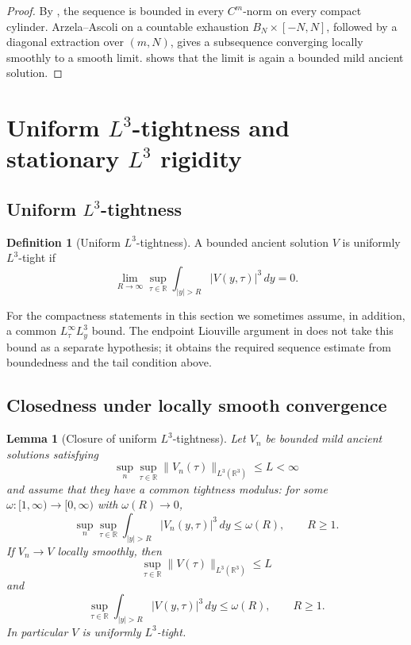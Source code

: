 \documentclass[11pt]{amsart}
\theoremstyle{plain}
\newtheorem{lemma}[theorem]{Lemma}
\theoremstyle{definition}
\newtheorem{definition}[theorem]{Definition}
\theoremstyle{remark}
\numberwithin{equation}{section}
\newcommand{\R}{\mathbb R}
\begin{document}
\begin{proof}
By , the sequence is bounded in every
\(C^m\)-norm on every compact cylinder.  Arzela--Ascoli on a countable
exhaustion \(B_N\times[-N,N]\), followed by a diagonal extraction over
\((m,N)\), gives a subsequence converging locally smoothly to a smooth limit.
 shows that the limit is again a bounded mild ancient
solution.
\end{proof}

\section{\texorpdfstring{Uniform \(L^3\)-tightness and stationary \(L^3\) rigidity}{Uniform L3-tightness and stationary L3 rigidity}}
\label{sec:tightness-rigidity}

\subsection{\texorpdfstring{Uniform \(L^3\)-tightness}{Uniform L3-tightness}}

\begin{definition}[Uniform \(L^3\)-tightness]\label{def:L3-tight}
A bounded ancient solution \(V\) is uniformly \(L^3\)-tight if
\[
   \lim_{R\to\infty}
   \sup_{\tau\in\R}
   \int_{|y|>R}|V(y,\tau)|^3\,dy=0 .
\]
\end{definition}

For the compactness statements in this section we sometimes assume, in
addition, a common \(L^\infty_\tau L^3_y\) bound.  The endpoint Liouville
argument in  does not take this bound as a
separate hypothesis; it obtains the required sequence estimate from boundedness
and the tail condition above.

\subsection{Closedness under locally smooth convergence}

\begin{lemma}[Closure of uniform \(L^3\)-tightness]\label{lem:tight-closure}
Let \(V_n\) be bounded mild ancient solutions satisfying
\[
   \sup_n\sup_{\tau\in\R}\|V_n(\tau)\|_{L^3(\R^3)}\le L<\infty
\]
and assume that they have a common tightness modulus: for some
\(\omega:[1,\infty)\to[0,\infty)\) with \(\omega(R)\to0\),
\[
   \sup_n\sup_{\tau\in\R}
   \int_{|y|>R}|V_n(y,\tau)|^3\,dy\le \omega(R),
   \qquad R\ge1.
\]
If \(V_n\to V\) locally smoothly, then
\[
   \sup_{\tau\in\R}\|V(\tau)\|_{L^3(\R^3)}\le L
\]
and
\[
   \sup_{\tau\in\R}
   \int_{|y|>R}|V(y,\tau)|^3\,dy\le \omega(R),
   \qquad R\ge1.
\]
In particular \(V\) is uniformly \(L^3\)-tight.
\end{lemma}
\end{document}

